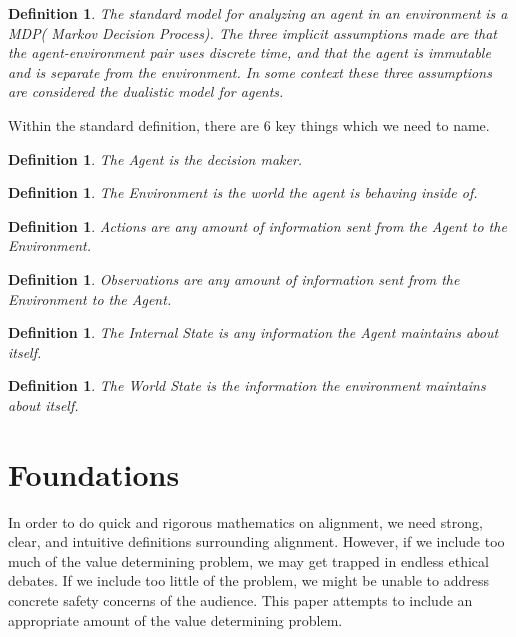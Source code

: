 \documentclass[12pt]{article}
\newtheorem{mydef}[thm]{Definition}
\begin{document}
\begin{mydef} The standard model for analyzing an agent in an environment is a MDP( Markov Decision Process). The three implicit assumptions made are that the agent-environment pair uses discrete time, and that the agent is immutable  and is separate from the environment. In some context these three assumptions are considered the dualistic model for agents.
\end{mydef}
Within the standard definition, there are 6 key things which we need to name.
\begin{mydef} The Agent is the decision maker.\end{mydef}\begin{mydef} The Environment is the world the agent is behaving inside of. \end{mydef} \begin{mydef} Actions are any amount of information sent from the Agent to the Environment. \end{mydef}\begin{mydef} Observations are any amount of information sent from the Environment to the Agent. \end{mydef}\begin{mydef} The Internal State is any information the Agent maintains about itself. \end{mydef}\begin{mydef}The World State is the information the environment maintains about itself.
\end{mydef}
\section{Foundations}

In order to do quick and rigorous mathematics on alignment, we need strong, clear, and intuitive definitions surrounding alignment. However, if we include too much of the value determining problem, we may get trapped in endless ethical debates. If we include too little of the problem, we might be unable to address concrete safety concerns of the audience. This paper attempts to include an appropriate amount of the value determining problem.
\end{document}
